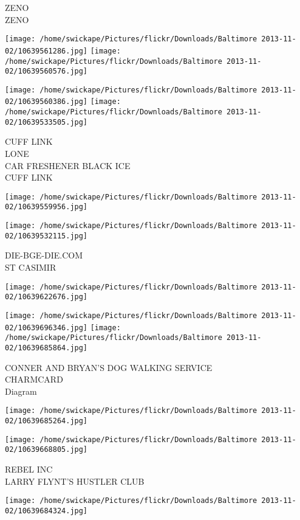 \documentclass[10pt,letterpaper]{article}
\begin{document}
ZENO\\
ZENO
\pagebreak

\texttt{[image: /home/swickape/Pictures/flickr/Downloads/Baltimore 2013-11-02/10639561286.jpg]}
\texttt{[image: /home/swickape/Pictures/flickr/Downloads/Baltimore 2013-11-02/10639560576.jpg]}

\texttt{[image: /home/swickape/Pictures/flickr/Downloads/Baltimore 2013-11-02/10639560386.jpg]}
\texttt{[image: /home/swickape/Pictures/flickr/Downloads/Baltimore 2013-11-02/10639533505.jpg]}

CUFF LINK\\
LONE\\
CAR FRESHENER BLACK ICE\\
CUFF LINK
\pagebreak

\texttt{[image: /home/swickape/Pictures/flickr/Downloads/Baltimore 2013-11-02/10639559956.jpg]}

\vspace{0.25in}
\texttt{[image: /home/swickape/Pictures/flickr/Downloads/Baltimore 2013-11-02/10639532115.jpg]}

DIE{-}BGE{-}DIE.COM\\
ST CASIMIR
\pagebreak

\texttt{[image: /home/swickape/Pictures/flickr/Downloads/Baltimore 2013-11-02/10639622676.jpg]}

\vspace{0.25in}
\texttt{[image: /home/swickape/Pictures/flickr/Downloads/Baltimore 2013-11-02/10639696346.jpg]}
\texttt{[image: /home/swickape/Pictures/flickr/Downloads/Baltimore 2013-11-02/10639685864.jpg]}

CONNER AND BRYAN'S DOG WALKING SERVICE\\
CHARMCARD\\
Diagram
\pagebreak

\texttt{[image: /home/swickape/Pictures/flickr/Downloads/Baltimore 2013-11-02/10639685264.jpg]}

\vspace{0.25in}
\texttt{[image: /home/swickape/Pictures/flickr/Downloads/Baltimore 2013-11-02/10639668805.jpg]}

REBEL INC\\
LARRY FLYNT'S HUSTLER CLUB
\pagebreak

\texttt{[image: /home/swickape/Pictures/flickr/Downloads/Baltimore 2013-11-02/10639684324.jpg]}
\end{document}

